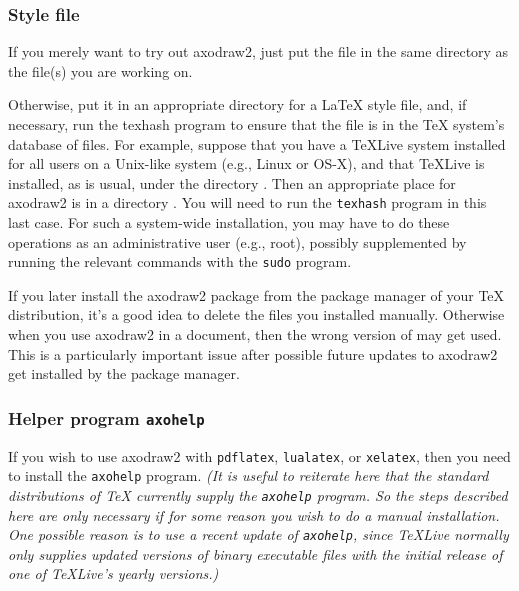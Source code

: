 \documentclass[12pt]{article}
\def\program#1{\texttt{#1}}
\begin{document}
\subsubsection{Style file \texorpdfstring{\protect{}}{axodraw2.sty}}

If you merely want to try out axodraw2, just put the file
 in the same directory as the 
file(s) you are working on. 

Otherwise, put it in an appropriate directory for a \LaTeX{} style
file, and, if necessary, run the texhash program to ensure that the
file is in the \TeX{} system's database of files.  For example,
suppose that you have a TeXLive system installed for all users on a
Unix-like system (e.g., Linux or OS-X), and that TeXLive is installed,
as is usual, under the directory .  Then an
appropriate place for axodraw2 is in a directory
.  You will
need to run the \program{texhash} program in this last case.  For such
a system-wide installation, you may have to do these
operations as an administrative user (e.g., root), possibly
supplemented by running the relevant commands with the \program{sudo}
program.

If you later install the axodraw2 package from the package manager of
your \TeX{} distribution, it's a good idea to delete the files you
installed manually.  Otherwise when you use axodraw2 in a document,
then the wrong version of  may get used.  This is a
particularly important issue after possible future updates to axodraw2
get installed by the package manager.

\subsubsection{Helper program \program{axohelp}}
\label{sec:axohelp}

If you wish to use axodraw2 with \program{pdflatex},
\program{lualatex}, or \program{xelatex}, then you need to install the
\program{axohelp} program.  \emph{(It is useful to reiterate here that
  the standard distributions of \TeX{} currently supply the
  \program{axohelp} program.  So the steps described here are only
  necessary if for some reason you wish to do a manual installation.
  One possible reason is to use a recent update of \program{axohelp},
  since TeXLive normally only supplies updated versions of binary
  executable files with the initial release of one of TeXLive's yearly
  versions.)}
\end{document}
